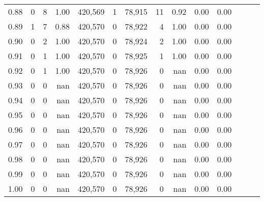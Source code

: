 \begin{tabular}{rrrrrrrrrrrrrr}
0.88 &       0 &      8 &  1.00 &  420,569 &        1 &  78,915 &      11 &  0.92 &  0.00 &      0.00 \\
0.89 &       1 &      7 &  0.88 &  420,570 &        0 &  78,922 &       4 &  1.00 &  0.00 &      0.00 \\
0.90 &       0 &      2 &  1.00 &  420,570 &        0 &  78,924 &       2 &  1.00 &  0.00 &      0.00 \\
0.91 &       0 &      1 &  1.00 &  420,570 &        0 &  78,925 &       1 &  1.00 &  0.00 &      0.00 \\
0.92 &       0 &      1 &  1.00 &  420,570 &        0 &  78,926 &       0 &   nan &  0.00 &      0.00 \\
0.93 &       0 &      0 &   nan &  420,570 &        0 &  78,926 &       0 &   nan &  0.00 &      0.00 \\
0.94 &       0 &      0 &   nan &  420,570 &        0 &  78,926 &       0 &   nan &  0.00 &      0.00 \\
0.95 &       0 &      0 &   nan &  420,570 &        0 &  78,926 &       0 &   nan &  0.00 &      0.00 \\
0.96 &       0 &      0 &   nan &  420,570 &        0 &  78,926 &       0 &   nan &  0.00 &      0.00 \\
0.97 &       0 &      0 &   nan &  420,570 &        0 &  78,926 &       0 &   nan &  0.00 &      0.00 \\
0.98 &       0 &      0 &   nan &  420,570 &        0 &  78,926 &       0 &   nan &  0.00 &      0.00 \\
0.99 &       0 &      0 &   nan &  420,570 &        0 &  78,926 &       0 &   nan &  0.00 &      0.00 \\
1.00 &       0 &      0 &   nan &  420,570 &        0 &  78,926 &       0 &   nan &  0.00 &      0.00 \\
\bottomrule
\end{tabular}
